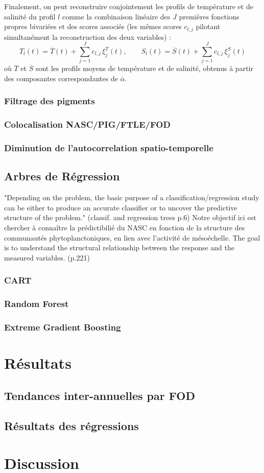\documentclass{article}
\begin{document}
	\vspace{1em}
	
	Finalement, on peut reconstruire conjointement les profils de température et de salinité du profil $l$ comme la combinaison linéaire des $J$ premières fonctions propres bivariées et des scores associés (les mêmes scores $c_{l,j}$ pilotant simultanément la reconstruction des deux variables) :
	\[
	T_l(t) = \overline{T}(t) + \sum_{j=1}^{J} c_{l,j}\, \xi_j^T(t), 
	\qquad
	S_l(t) = \overline{S}(t) + \sum_{j=1}^{J} c_{l,j}\, \xi_j^S(t)
	\]
	où $\overline{T}$ et $\overline{S}$ sont les profils moyens de température et de salinité, obtenus à partir des composantes correspondantes de $\overline\alpha$.
	\subsubsection{Filtrage des pigments}
	\subsubsection{Colocalisation NASC/PIG/FTLE/FOD}
	\subsubsection{Diminution de l'autocorrelation spatio-temporelle}
	
	\subsection{Arbres de Régression}
	"Depending on the problem, the basic purpose of a classification/regression study can be either to produce an accurate classifier or to uncover the predictive structure of the problem." (classif. and regression trees p.6)
	Notre objectif ici est chercher à connaître la prédictibilié du NASC en fonction de la structure des communautés phytoplanctoniques, en lien avec l'activité de mésoéchelle. The goal is to understand the structural relationship between  the response and the measured variables. (p.221)
	
	\subsubsection{CART}
	
	\subsubsection{Random Forest}
	
	\subsubsection{Extreme Gradient Boosting}
	
	\clearpage
	\section{Résultats}
	\subsection{Tendances inter-annuelles par FOD}
	\subsection{Résultats des régressions}
	
	\clearpage
	\section{Discussion}
	
\end{document}
